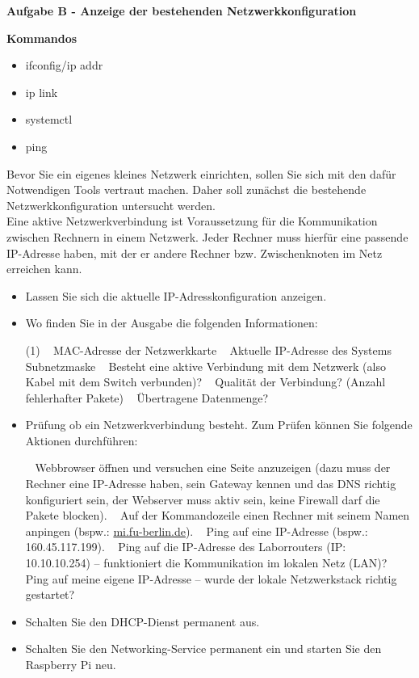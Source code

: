 \documentclass[paper=a4,fontsize=11pt]{scrartcl}%
\numberwithin{equation}{section}
\begin{document}
\begin{center}
\Large{\textbf{Aufgabe B - Anzeige der bestehenden Netzwerkkonfiguration}}
\end{center}\vskip0.25in
\textbf{Kommandos}
\begin{multicols}{3}
\begin{itemize}
	\item ifconfig/ip addr
	\item ip link
	\item systemctl
	\item ping
\end{itemize}
\end{multicols}
Bevor Sie ein eigenes kleines Netzwerk einrichten, sollen Sie sich mit den dafür Notwendigen Tools vertraut machen. Daher soll zunächst die bestehende Netzwerkkonfiguration untersucht werden.\\
Eine aktive Netzwerkverbindung ist Voraussetzung für die Kommunikation zwischen Rechnern in einem Netzwerk. Jeder Rechner muss hierfür eine passende IP-Adresse haben, mit der er andere Rechner bzw. Zwischenknoten im Netz erreichen kann.
\begin{itemize}
	\item[1.)] Lassen Sie sich die aktuelle IP-Adresskonfiguration anzeigen.
	\item[2.)] Wo finden Sie in der Ausgabe die folgenden Informationen:
	\begin{tasks}(1)
		\task~ MAC-Adresse der Netzwerkkarte
		\task~ Aktuelle IP-Adresse des Systems
		\task~ Subnetzmaske
		\task~ Besteht eine aktive Verbindung mit dem Netzwerk (also Kabel mit dem Switch verbunden)?
		\task~ Qualität der Verbindung? (Anzahl fehlerhafter Pakete)
		\task~ Übertragene Datenmenge?
	\end{tasks}
	\item[3.)] Prüfung ob ein Netzwerkverbindung besteht. Zum Prüfen können Sie folgende Aktionen durchführen:
	\begin{tasks}
		\task~ Webbrowser öffnen und versuchen eine Seite anzuzeigen (dazu muss der Rechner eine IP-Adresse
haben, sein Gateway kennen und das DNS richtig konfiguriert sein, der Webserver muss aktiv sein, keine Firewall darf die Pakete blocken).
		\task~ Auf der Kommandozeile einen Rechner mit seinem Namen anpingen (bspw.: \url{mi.fu-berlin.de}).
		\task~ Ping auf eine IP-Adresse (bspw.: 160.45.117.199).
		\task~ Ping auf die IP-Adresse des Laborrouters (IP: 10.10.10.254) -- funktioniert die Kommunikation im lokalen Netz (LAN)?
		\task~ Ping auf meine eigene IP-Adresse -- wurde der lokale Netzwerkstack richtig gestartet?
	\end{tasks}
	\item[4.)] Schalten Sie den DHCP-Dienst permanent aus.
	\item[5.)] Schalten Sie den Networking-Service permanent ein und starten Sie den Raspberry Pi neu.
\end{itemize}
\end{document}
